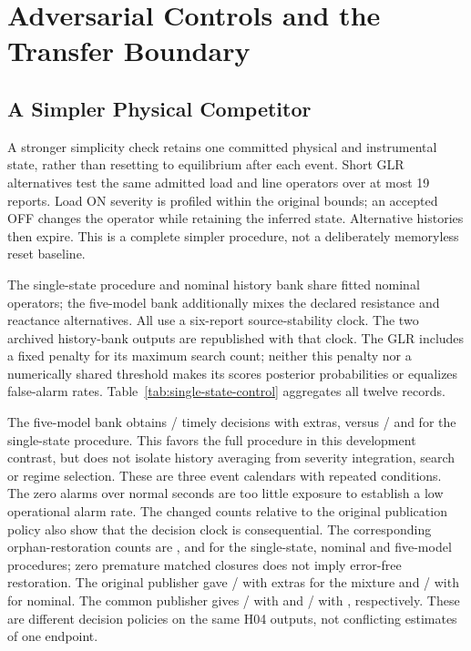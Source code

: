 \section{Adversarial Controls and the Transfer Boundary}
\label{sec:submission-checks}

\subsection{A Simpler Physical Competitor}
A stronger simplicity check retains one committed physical and instrumental
state, rather than resetting to equilibrium after each event. Short GLR
alternatives test the same admitted load and line operators over at most
19 reports. Load ON severity is profiled within the original bounds; an
accepted OFF changes the operator while retaining the inferred state.
Alternative histories then expire. This is a complete simpler procedure,
not a deliberately memoryless reset baseline.

The single-state procedure and nominal history bank share fitted nominal
operators; the five-model bank additionally mixes the declared resistance
and reactance alternatives. All use a six-report source-stability clock.
The two archived history-bank
outputs are republished with that clock. The GLR includes a fixed penalty
for its maximum search count; neither this penalty nor a numerically
shared threshold makes its scores posterior probabilities or equalizes
false-alarm rates. Table~\ref{tab:single-state-control} aggregates all twelve records.

The five-model bank obtains \SSMixTimely{}/\SSMixTotal{} timely decisions
with \SSMixExtras{} extras, versus \SSSimpleTimely{}/\SSSimpleTotal{} and
\SSSimpleExtras{} for the single-state procedure. This favors the full
procedure in this development contrast, but does not isolate history
averaging from severity integration, search or regime selection. These are
three event calendars with repeated conditions. The zero alarms over
\SSNormalSeconds{} normal seconds are too little exposure to establish a
low operational alarm rate. The changed counts relative to the original
publication policy also show that the decision clock is consequential.
The corresponding orphan-restoration counts are \SSSimpleOrphan{},
\SSNomOrphan{} and \SSMixOrphan{} for the single-state, nominal and five-model
procedures; zero premature matched closures does not imply error-free restoration.
The original publisher gave \ContMixTimely{}/\ContMixTotal{} with
\ContMixExtras{} extras for the mixture and
\ContNomTimely{}/\ContNomTotal{} with \ContNomExtras{} for nominal.
The common publisher gives \SSMixTimely{}/\SSMixTotal{} with
\SSMixExtras{} and \SSNomTimely{}/\SSNomTotal{} with \SSNomExtras{},
respectively. These are different decision policies on the same H04 outputs,
not conflicting estimates of one endpoint.

